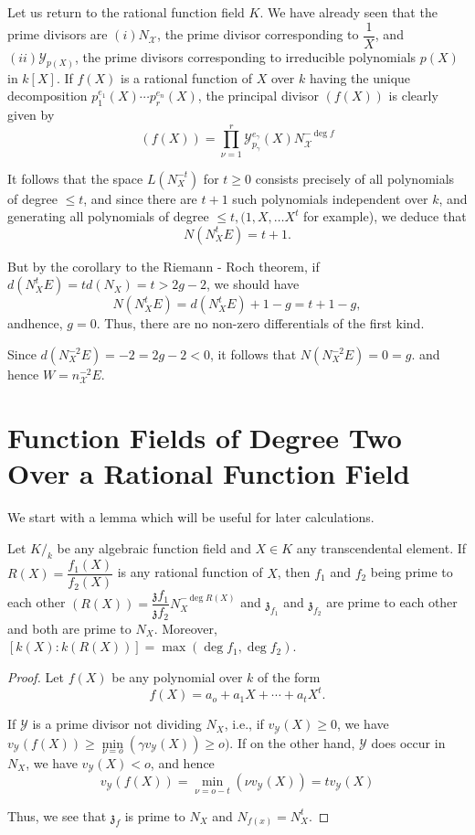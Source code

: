 Let us return to the rational function field $K$. We have already seen
that the prime divisors are $(i)N_{\mathcal{X}}$, the prime divisor
corresponding to $\dfrac{1}{X}$, and $(ii) \mathscr{Y}_{p(X)}$, the
prime divisors corresponding to irreducible polynomials $p(X)$ in
$k[X]$. If $f(X)$ is a rational function of $X$ over $k$ having the
unique decomposition $p_1^{e_1} (X) \cdots p_r^{e_n}(X)$, the
principal divisor $(f(X))$ is clearly given by 
$$
(f(X)) = \prod^{r}_{\nu  = 1} \mathscr{Y}_{p_\gamma}^{e_\gamma} (X)
N_{\mathcal{X}}^{- \deg f} 
$$

It follows that the space $L(N^{-t}_X)$ for $t \ge 0$
consists precisely of all polynomials of degree $\le t$, and since
there are $t + 1$ such polynomials independent over $k$, and
generating all polynomials of degree $\le t, (1, X, \ldots X^t$ for
example), we deduce that 
$$
N(N^t_X E) = t + 1 .
$$

But by the corollary to the Riemann - Roch theorem, if
$d(N_X^t E) = td (N_{X}) = t > 2g - 2$, we should
have 
$$
N(N^t_{X} E) = d(N_{X}^t E) + 1 - g = t + 1 - g,
$$
and\pageoriginale hence, $g = 0$. Thus, there are no non-zero differentials of the
first kind. 

Since $d (N_{X}^{-2} E) = - 2 = 2g - 2 < 0$, it follows that
$N(N^{-2}_X E) = 0 = g$. and hence $W = n^{-2}_\mathcal{X} E$. 


\section[Function Fields of Degree Two...]{Function Fields of Degree Two Over a Rational Function
  Field}\label{chap9:sec17} %


We start with a lemma which will be useful for later calculations.

\begin{lemma*}
  Let $K/_k$ be any algebraic function field and $X \in K$ any
  transcendental element. If $R(X) = \dfrac{f_1(X)}{f_2(X)}$ is any
  rational function of $X$, then $f_1$ and $f_2$ being prime to each
  other $(R(X)) = \dfrac{\mathfrak{z}f_1}{\mathfrak{z}f_2}
  N_X^{- \deg R(X)}$ and $\mathfrak{z}_{f_1}$ and
  $\mathfrak{z}_{f_2}$ are prime to each other and both are prime to
  $N_{X}$. Moreover, $[k(X) : k(R(X))] = \max (\deg f_1, \deg
  f_2)$. 
\end{lemma*}

\begin{proof}
  Let $f(X)$ be any polynomial over $k$ of the form
  $$
  f(X) = a_o + a_1 X + \cdots + a_t X^t.
  $$

  If $\mathscr{Y}$ is a prime divisor not dividing $N_{X}$,
  i.e., if $v_{\mathscr{Y}} (X) \ge 0$, we have $v_{\mathscr{Y}} (f(X))
  \ge \min\limits_{\nu = o} (\gamma v_{\mathscr{Y}}(X)) \ge o)$. If on the
  other hand, $\mathscr{Y}$ does occur in $N_{X}$, we have
  $v_{\mathscr{Y}} (X) < o$, and hence 
  $$
  v_{\mathscr{Y}} (f(X)) = \min\limits_{\nu = o -t} (\nu
  v_{\mathscr{Y}}(X)) = t v_{\mathscr{Y}} (X) 
  $$
  
  Thus, we see that $\mathfrak{z}_f$ is prime to $N_{X}$ and
  $N_{f (x)} = N^t_{X}$. 
\end{proof}

